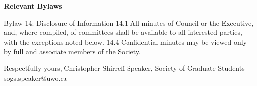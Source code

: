 \begin{multicols}{2}
\begin{longenum}[ label*=\arabic*., align=left]
\item \textbf{Relevant Bylaws}

Bylaw 14: Disclosure of Information
14.1 All minutes of Council or the Executive, and,  where compiled,  of committees shall be available to all interested parties, with the exceptions noted below.
14.4 Confidential minutes may be viewed only by full and associate members of the Society.

\end{longenum}
\end{multicols}


\noindent
Respectfully yours, \newline
\noindent
Christopher Shirreff \newline
\indent
Speaker, \newline 
\indent
Society of Graduate Students \newline
\indent
sogs.speaker@uwo.ca \newline

